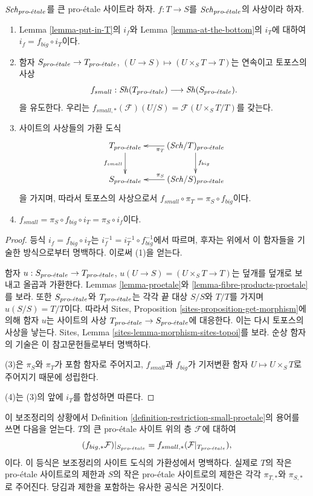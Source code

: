 \begin{lemma}
\label{lemma-morphism-big-small}
$\mathit{Sch}_{pro\text{-}\acute{e}tale}$를 큰 pro-\'etale 사이트라 하자.
$f : T \to S$를 $\mathit{Sch}_{pro\text{-}\acute{e}tale}$의 사상이라 하자.
\begin{enumerate}
\item Lemma \ref{lemma-put-in-T}의 $i_f$와
Lemma \ref{lemma-at-the-bottom}의 $i_T$에 대하여
$i_f = f_{big} \circ i_T$이다.
\item 함자 $S_{pro\text{-}\acute{e}tale} \to T_{pro\text{-}\acute{e}tale}$,
$(U \to S) \mapsto (U \times_S T \to T)$는 연속이고 토포스의 사상
$$
f_{small} : \mathop{\mathit{Sh}}\nolimits(T_{pro\text{-}\acute{e}tale}) \longrightarrow \mathop{\mathit{Sh}}\nolimits(S_{pro\text{-}\acute{e}tale}).
$$
을 유도한다. 우리는
$f_{small, *}(\mathcal{F})(U/S) = \mathcal{F}(U \times_S T/T)$를 갖는다.
\item 사이트의 사상들의 가환 도식
$$
\xymatrix{
T_\proetale \ar[d]_{f_{small}} &
(\Sch/T)_\proetale \ar[d]^{f_{big}} \ar[l]^{\pi_T}\\
S_\proetale &
(\Sch/S)_\proetale \ar[l]_{\pi_S}
}
$$
을 가지며, 따라서 토포스의 사상으로서
$f_{small} \circ \pi_T = \pi_S \circ f_{big}$이다.
\item $f_{small} = \pi_S \circ f_{big} \circ i_T = \pi_S \circ i_f$이다.
\end{enumerate}
\end{lemma}

\begin{proof}
등식 $i_f = f_{big} \circ i_T$는
$i_f^{-1} = i_T^{-1} \circ f_{big}^{-1}$에서 따르며,
후자는 위에서 이 함자들을 기술한 방식으로부터 명백하다.
이로써 (1)을 얻는다.

\medskip\noindent
함자 $u : S_{pro\text{-}\acute{e}tale} \to T_{pro\text{-}\acute{e}tale}$,
$u(U \to S) = (U \times_S T \to T)$는 덮개를 덮개로 보내고
올곱과 가환한다. Lemmas \ref{lemma-proetale}와
\ref{lemma-fibre-products-proetale}를 보라.
또한 $S_{pro\text{-}\acute{e}tale}$와 $T_{pro\text{-}\acute{e}tale}$는 각각 끝 대상 $S/S$와 $T/T$를 가지며
$u(S/S) = T/T$이다. 따라서 Sites, Proposition
\ref{sites-proposition-get-morphism}에 의해 함자 $u$는 사이트의 사상
$T_{pro\text{-}\acute{e}tale} \to S_{pro\text{-}\acute{e}tale}$에 대응한다. 이는 다시 토포스의 사상을
낳는다. Sites, Lemma \ref{sites-lemma-morphism-sites-topoi}를 보라.
순상 함자의 기술은 이 참고문헌들로부터 명백하다.

\medskip\noindent
(3)은 $\pi_S$와 $\pi_T$가 포함 함자로 주어지고,
$f_{small}$과 $f_{big}$가 기저변환 함자
$U \mapsto U \times_S T$로 주어지기 때문에 성립한다.

\medskip\noindent
(4)는 (3)의 앞에 $i_T$를 합성하면 따른다.
\end{proof}

\noindent
이 보조정리의 상황에서 Definition
\ref{definition-restriction-small-proetale}의 용어를 쓰면 다음을 얻는다.
$T$의 큰 pro-\'etale 사이트 위의 층 $\mathcal{F}$에 대하여
\begin{equation}
\label{equation-compare-big-small}
(f_{big, *}\mathcal{F})|_{S_{pro\text{-}\acute{e}tale}} =
f_{small, *}(\mathcal{F}|_{T_{pro\text{-}\acute{e}tale}}),
\end{equation}
이다. 이 등식은 보조정리의 사이트 도식의 가환성에서 명백하다.
실제로 $T$의 작은 pro-\'etale 사이트로의 제한과 $S$의 작은
pro-\'etale 사이트로의 제한은 각각 $\pi_{T, *}$와 $\pi_{S, *}$로
주어진다. 당김과 제한을 포함하는 유사한 공식은 거짓이다.

